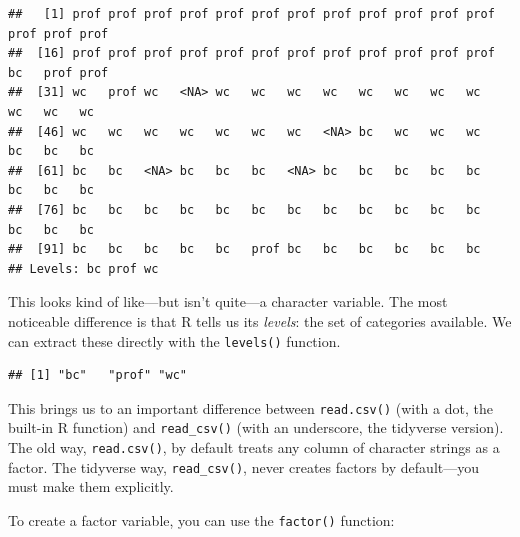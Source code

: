 \documentclass[
  12pt,
  oneside,openany]{book}
\newenvironment{Shaded}{\begin{snugshade}}{\end{snugshade}}
\newcommand{\FunctionTok}[1]{\textcolor[rgb]{0.00,0.00,0.00}{#1}}
\newcommand{\NormalTok}[1]{#1}
\newcommand{\SpecialCharTok}[1]{\textcolor[rgb]{0.00,0.00,0.00}{#1}}
\begin{document}
\begin{Shaded}
\end{Shaded}

\begin{verbatim}
##   [1] prof prof prof prof prof prof prof prof prof prof prof prof prof prof prof
##  [16] prof prof prof prof prof prof prof prof prof prof prof prof bc   prof prof
##  [31] wc   prof wc   <NA> wc   wc   wc   wc   wc   wc   wc   wc   wc   wc   wc  
##  [46] wc   wc   wc   wc   wc   wc   wc   <NA> bc   wc   wc   wc   bc   bc   bc  
##  [61] bc   bc   <NA> bc   bc   bc   <NA> bc   bc   bc   bc   bc   bc   bc   bc  
##  [76] bc   bc   bc   bc   bc   bc   bc   bc   bc   bc   bc   bc   bc   bc   bc  
##  [91] bc   bc   bc   bc   bc   prof bc   bc   bc   bc   bc   bc  
## Levels: bc prof wc
\end{verbatim}

This looks kind of like---but isn't quite---a character variable. The most noticeable difference is that R tells us its \emph{levels}: the set of categories available. We can extract these directly with the \texttt{levels()} function.

\begin{Shaded}
\end{Shaded}

\begin{verbatim}
## [1] "bc"   "prof" "wc"
\end{verbatim}

This brings us to an important difference between \texttt{read.csv()} (with a dot, the built-in R function) and \texttt{read\_csv()} (with an underscore, the tidyverse version). The old way, \texttt{read.csv()}, by default treats any column of character strings as a factor. The tidyverse way, \texttt{read\_csv()}, never creates factors by default---you must make them explicitly.

To create a factor variable, you can use the \texttt{factor()} function:
\end{document}

